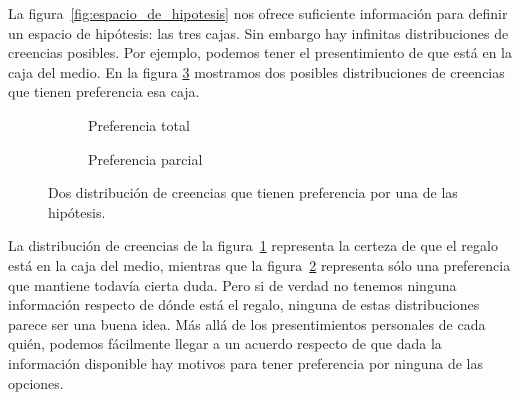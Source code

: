 \documentclass[a4paper,10pt]{book}
\begin{document}
%
La figura~\ref{fig:espacio_de_hipotesis} nos ofrece suficiente información para definir un espacio de hipótesis: las tres cajas.
%
Sin embargo hay infinitas distribuciones de creencias posibles.
%
Por ejemplo, podemos tener el presentimiento de que está en la caja del medio.
%
En la figura \ref{fig:distribucion_de_creencias} mostramos dos posibles distribuciones de creencias que tienen preferencia esa caja.
%
\begin{figure}[H]     
 \centering
 \begin{subfigure}[b]{0.48\textwidth}
 \centering
    \caption{Preferencia total}
    \label{fig:preferencia_total}
 \end{subfigure}
 \begin{subfigure}[b]{0.48\textwidth}
 \centering
    \caption{Preferencia parcial}
    \label{fig:preferencia_parcial}
 \end{subfigure}
\caption{Dos distribución de creencias que tienen preferencia por una de las hipótesis.}
 \label{fig:distribucion_de_creencias}
\end{figure}
%
La distribución de creencias de la figura~\ref{fig:preferencia_total} representa la certeza de que el regalo está en la caja del medio, mientras que la figura~\ref{fig:preferencia_parcial} representa sólo una preferencia que mantiene todavía cierta duda.
%
Pero si de verdad no tenemos ninguna información respecto de dónde está el regalo, ninguna de estas distribuciones parece ser una buena idea.
%
Más allá de los presentimientos personales de cada quién, podemos fácilmente llegar a un acuerdo respecto de que dada la información disponible hay motivos para tener preferencia por ninguna de las opciones.
\end{document}
